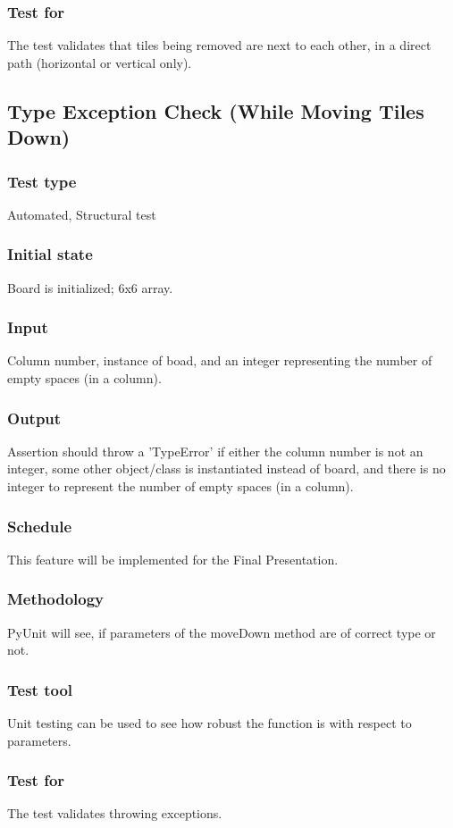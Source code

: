 \documentclass[12pt]{article}
\begin{document}
\subsubsection{Test for}
The test validates that tiles being removed are next to each other, in a direct path (horizontal or vertical only).

\newpage

\subsection{Type Exception Check (While Moving Tiles Down)}
\subsubsection{Test type}
Automated, Structural test
\subsubsection{Initial state}
Board is initialized; 6x6 array.
\subsubsection{Input}
Column number, instance of boad, and an integer representing the number of empty spaces (in a column). 
\subsubsection{Output}
Assertion should throw a 'TypeError' if either the column number is not an integer, some other object/class is instantiated instead of board, and there is no integer to represent the number of empty spaces (in a column).
\subsubsection{Schedule}
This feature will be implemented for the Final Presentation.
\subsubsection{Methodology}
PyUnit will see, if parameters of the moveDown method are of correct type or not. 
\subsubsection{Test tool}
Unit testing can be used to see how robust the function is with respect to parameters.
\subsubsection{Test for}
The test validates throwing exceptions.
\end{document}
